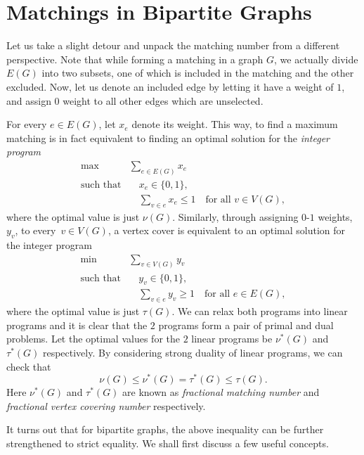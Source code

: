 \documentclass[math]{amznotes}
\theoremstyle{remark}
\begin{document}
\section{Matchings in Bipartite Graphs}
Let us take a slight detour and unpack the matching number from a different perspective. Note that while forming a matching in a graph $G$, we actually divide $E(G)$ into two subsets, one of which is included in the matching and the other excluded. Now, let us denote an included edge by letting it have a weight of $1$, and assign $0$ weight to all other edges which are unselected.

For every $e \in E(G)$, let $x_e$ denote its weight. This way, to find a maximum matching is in fact equivalent to finding an optimal solution for the \textit{integer program}
\begin{align*}
    \max & \sum_{e \in E(G)}x_e \\
    \textrm{such that} & \quad x_e \in \{0, 1\}, \\
    & \quad \sum_{v \in e}x_e \leq 1 \quad\textrm{for all } v \in V(G),
\end{align*}
where the optimal value is just $\nu(G)$. Similarly, through assigning $0$-$1$ weights, $y_v$, to every~$v \in V(G)$, a vertex cover is equivalent to an optimal solution for the integer program 
\begin{align*}
    \min & \sum_{v \in V(G)}y_v \\
    \textrm{such that} & \quad y_v \in \{0, 1\}, \\
    & \quad \sum_{v \in e}y_v \geq 1 \quad \textrm{for all } e \in E(G),
\end{align*}
where the optimal value is just $\tau(G)$. We can relax both programs into linear programs and it is clear that the $2$ programs form a pair of primal and dual problems. Let the optimal values for the $2$ linear programs be $\nu^*(G)$ and $\tau^*(G)$ respectively. By considering strong duality of linear programs, we can check that
\begin{equation*}
    \nu(G) \leq \nu^*(G) = \tau^*(G) \leq \tau(G).
\end{equation*}
Here $\nu^*(G)$ and $\tau^*(G)$ are known as \textit{fractional matching number} and \textit{fractional vertex covering number} respectively.

It turns out that for bipartite graphs, the above inequality can be further strengthened to strict equality. We shall first discuss a few useful concepts.
\end{document}

